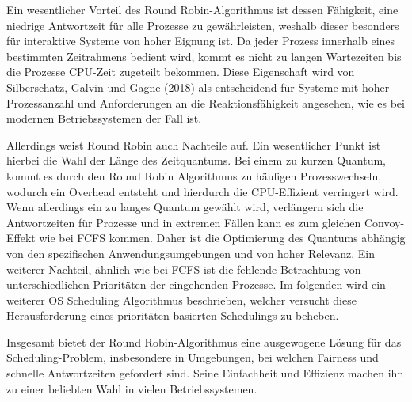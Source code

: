 Ein wesentlicher Vorteil des Round Robin-Algorithmus ist dessen Fähigkeit, eine niedrige Antwortzeit für alle Prozesse zu gewährleisten, weshalb dieser besonders für interaktive Systeme von hoher Eignung ist. Da jeder Prozess innerhalb eines bestimmten Zeitrahmens bedient wird, kommt es nicht zu langen Wartezeiten bis die Prozesse \ac{CPU}-Zeit zugeteilt bekommen. Diese Eigenschaft wird von Silberschatz, Galvin und Gagne (2018) als entscheidend für Systeme mit hoher Prozessanzahl und Anforderungen an die Reaktionsfähigkeit angesehen, wie es bei modernen Betriebssystemen der Fall ist. 

Allerdings weist Round Robin auch Nachteile auf. Ein wesentlicher Punkt ist hierbei die Wahl der Länge des Zeitquantums. Bei einem zu kurzen Quantum, kommt es durch den Round Robin Algorithmus zu häufigen Prozesswechseln, wodurch ein Overhead entsteht und hierdurch die \ac{CPU}-Effizient verringert wird. %
Wenn allerdings ein zu langes Quantum gewählt wird, verlängern sich die Antwortzeiten für Prozesse und in extremen Fällen kann es zum gleichen Convoy-Effekt wie bei \ac{FCFS} kommen. Daher ist die Optimierung des Quantums abhängig von den spezifischen Anwendungsumgebungen und von hoher Relevanz. Ein weiterer Nachteil, ähnlich wie bei \ac{FCFS} ist die fehlende Betrachtung von unterschiedlichen Prioritäten der eingehenden Prozesse. Im folgenden wird ein weiterer OS Scheduling Algorithmus beschrieben, welcher versucht diese Herausforderung eines prioritäten-basierten Schedulings zu beheben. 

Insgesamt bietet der Round Robin-Algorithmus eine ausgewogene Lösung für das Scheduling-Problem, insbesondere in Umgebungen, bei welchen Fairness und schnelle Antwortzeiten gefordert sind. Seine Einfachheit und Effizienz machen ihn zu einer beliebten Wahl in vielen Betriebssystemen.

